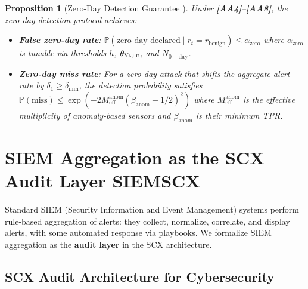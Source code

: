 \documentclass[11pt,a4paper]{article}
\newtheorem{proposition}[theorem]{Proposition}
\theoremstyle{definition}
\theoremstyle{remark}
\newcommand{\assumptionTag}[1]{\textsf{\textbf{[A#1]}}}
\newcommand{\Yajie}{\textsc{Yajie}}
\newcommand{\Pbb}{\mathbb{P}}
\newcommand{\zeroday}{\mathrm{0-day}}
\begin{document}
\begin{proposition}[Zero-Day Detection Guarantee ]
\label{prop:zeroday_guarantee}
Under \assumptionTag{A4}--\assumptionTag{A8}, the zero-day detection protocol achieves:
\begin{itemize}[nosep]
    \item \textbf{False zero-day rate}: $\Pbb(\text{zero-day declared} \mid r_t = r_{\mathrm{benign}}) \leq \alpha_{\mathrm{zero}}$ where $\alpha_{\mathrm{zero}}$ is tunable via thresholds $h$, $\theta_{\Yajie}$, and $N_{\zeroday}$.
    \item \textbf{Zero-day miss rate}: For a zero-day attack that shifts the aggregate alert rate by $\delta_1 \geq \delta_{\min}$, the detection probability satisfies $\Pbb(\text{miss}) \leq \exp(-2 M_{\mathrm{eff}}^{\mathrm{anom}} (\beta_{\mathrm{anom}} - 1/2)^2)$ where $M_{\mathrm{eff}}^{\mathrm{anom}}$ is the effective multiplicity of anomaly-based sensors and $\beta_{\mathrm{anom}}$ is their minimum TPR.
\end{itemize}
\end{proposition}

\section{SIEM Aggregation as the SCX Audit Layer SIEMSCX}
\label{sec:siem}

Standard SIEM (Security Information and Event Management) systems perform rule-based aggregation of alerts: they collect, normalize, correlate, and display alerts, with some automated response via playbooks. We formalize SIEM aggregation as the \textbf{audit layer} in the SCX architecture.

\subsection{SCX Audit Architecture for Cybersecurity}
\end{document}
